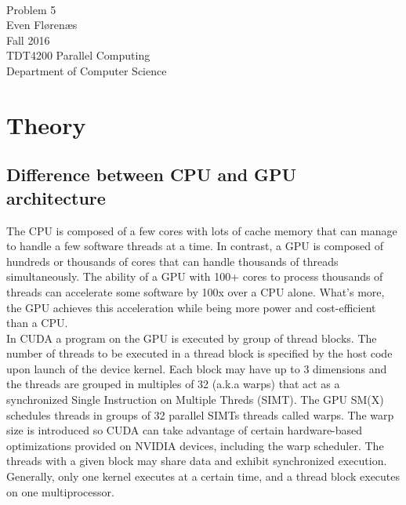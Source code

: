 \documentclass[12pt]{article}
\begin{document}
\thispagestyle{empty}
\mbox{}\\[6pc]
\begin{center}
\Huge{Problem 5}\\[2pc]

\Large{Even Flørenæs}\\[1pc]
\Large{Fall 2016}\\[2pc]

TDT4200 Parallel Computing\\
Department of Computer Science
\end{center}
\vfill

\newpage
\tableofcontents
\newpage
\section{Theory}
\subsection{Difference between CPU and GPU architecture}
The CPU is composed of a few cores with lots of cache memory that can manage to handle a few software threads at a time. In contrast, a GPU is composed of hundreds or thousands of cores that can handle thousands of threads simultaneously. The ability of a GPU with 100+ cores to process thousands of threads can accelerate some software by 100x over a CPU alone. What's more, the GPU achieves this acceleration while being more power and cost-efficient than a CPU.
\\[10pt]
In CUDA a program on the GPU is executed by group of thread blocks. The number of threads to be executed in a thread block is specified by the host code upon launch of the device kernel. Each block may have up to 3 dimensions and the threads are grouped in multiples of 32 (a.k.a warps) that act as a synchronized Single Instruction on Multiple Threds (SIMT). The GPU SM(X) schedules threads in groups of 32 parallel SIMTs threads called warps. The warp size is introduced so CUDA can take advantage of certain hardware-based optimizations provided on NVIDIA devices, including the warp scheduler. The threads with a given block may share data and exhibit synchronized execution. Generally, only one kernel executes at a certain time, and a thread block executes on one multiprocessor.
\end{document}
